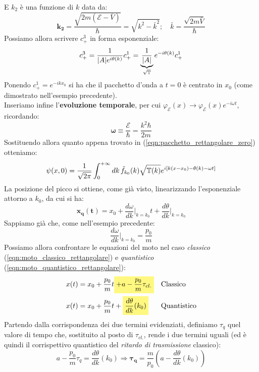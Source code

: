 \documentclass[../../FisicaTeorica.tex]{subfiles}
\begin{document}
E $k_2$ è una funzione di $k$ data da:
\begin{equation}
\bm{k_2} = \frac{\sqrt{2m(\mathcal{E}-\bar{V})}}{\hbar}=\sqrt{k^2-\bar{k}^2}; \quad \bar{k}=\frac{\sqrt{2m\bar{V}}}{\hbar}
\label{eqn:k2function}
\end{equation}
Possiamo allora scrivere $c^3_+$ in forma esponenziale:
\[
c^3_+ = \frac{1}{|A|e^{i\theta(k)}}c^1_+=\underbrace{\frac{1}{|A|}}_{\sqrt{\mathbb{T}}}e^{-i\theta(k)}c^1_+
\]
Ponendo $c^1_+ = e^{-ikx_0}$ si ha che il pacchetto d'onda a $t=0$ è centrato in $x_0$ (come dimostrato nell'esempio precedente).\\ %
Inseriamo infine l'\textbf{evoluzione temporale}, per cui $\varphi_\mathcal{E}(x)\to \varphi_\mathcal{E}(x) e^{-i\omega t}$, ricordando:
\[
\bm{\omega} \equiv \frac{\mathcal{E}}{\hbar}=\frac{k^2 \hbar}{2m}
\]
Sostituendo allora quanto appena trovato in (\ref{eqn:pacchetto_rettangolare_zero}) otteniamo:
\[
\psi(x,0)=\frac{1}{\sqrt{2\pi}}\int_0^{+\infty} dk\,\tilde{f}_{k_0}(k) \sqrt{\mathbb{T}(k)} e^{i[k(x-x_0)-\theta(k)-\omega t]}
\]
La posizione del picco si ottiene, come già visto, linearizzando l'esponenziale attorno a $k_0$, da cui si ha:
\begin{equation}
\bm{x_q(t)} = x_0+ \frac{d\omega}{dk}\Big|_{k=k_0} t + {\frac{d\theta}{dk}\Big|_{k=k_0}}
\label{eqn:moto_quantistico_rettangolare}
\end{equation}
Sappiamo già che, come nell'esempio precedente:
\[
\frac{d\omega}{dk}\Big|_{k=k_0}=\frac{p_0}{m}
\]
Possiamo allora confrontare le equazioni del moto nel caso \textit{classico} (\ref{eqn:moto_classico_rettangolare}) e \textit{quantistico} (\ref{eqn:moto_quantistico_rettangolare}):
\begin{align*}
x(t)&= x_0 + \frac{p_0}{m}t \hlc{Yellow}{+ a - \frac{p_0}{m}\tau_{cl.}} &&\text{Classico}\\
x(t)&=x_0+\frac{p_0}{m}t+\hlc{Yellow}{\frac{d\theta}{dk}(k_0)} && \text{Quantistico}
\end{align*}
Partendo dalla corrispondenza dei due termini evidenziati, definiamo $\tau_q$ quel valore di tempo che, sostituito al posto di $\tau_{cl.}$, rende i due termini uguali (ed è quindi il corrispettivo quantistico del \textit{ritardo di trasmissione} classico):
\begin{equation}
a-\frac{p_0}{m}\tau_q =\frac{d\theta}{dk}(k_0) \Rightarrow
\bm{\tau_q}=\frac{m}{p_0}\left(a-\frac{d\theta}{dk}(k_0)\right)
\label{eqn:ritardo_trasmissione_quantistico}
\end{equation}
\end{document}
